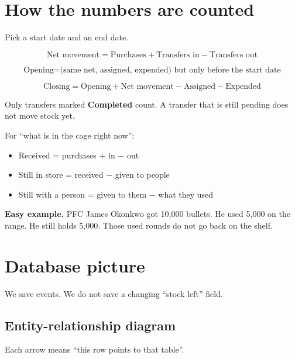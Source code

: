 \documentclass[11pt,a4paper]{article}
\begin{document}
\section{How the numbers are counted}

Pick a start date and an end date.

\[
\text{Net movement} = \text{Purchases} + \text{Transfers in} - \text{Transfers out}
\]

\[
\text{Opening} = \text{(same net, assigned, expended) but only before the start date}
\]

\[
\text{Closing} = \text{Opening} + \text{Net movement} - \text{Assigned} - \text{Expended}
\]

Only transfers marked \textbf{Completed} count. A transfer that is still pending does not move stock yet.

For ``what is in the cage right now'':

\begin{itemize}
  \item Received = purchases + in $-$ out
  \item Still in store = received $-$ given to people
  \item Still with a person = given to them $-$ what they used
\end{itemize}

\textbf{Easy example.} PFC James Okonkwo got 10{,}000 bullets. He used 5{,}000 on the range. He still holds 5{,}000. Those used rounds do not go back on the shelf.

\section{Database picture}

We save events. We do not save a changing ``stock left'' field.

\subsection{Entity-relationship diagram}

Each arrow means ``this row points to that table''.
\end{document}
